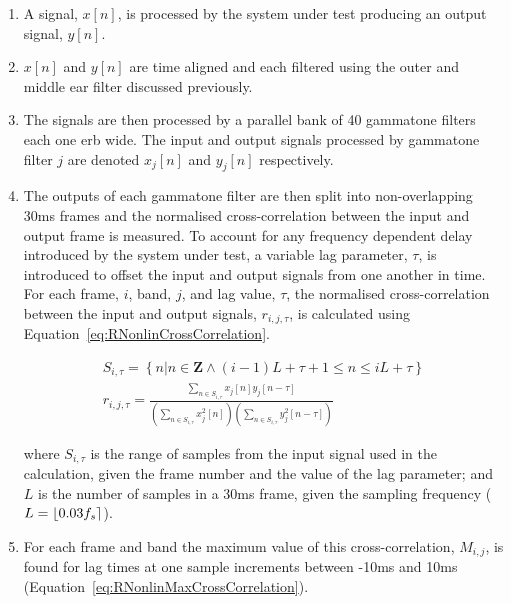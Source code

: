 			\begin{enumerate}
				\item A signal, $x[n]$, is processed by the system under test producing an output signal,
					$y[n]$.

				\item $x[n]$ and $y[n]$ are time aligned and each filtered using the outer and middle ear
					filter discussed previously.

				\item The signals are then processed by a parallel bank of 40 gammatone filters each one
					\acrshort{erb} wide. The input and output signals processed by gammatone filter $j$
					are denoted $x_j[n]$ and $y_j[n]$ respectively.

				\item The outputs of each gammatone filter are then split into non-overlapping 30ms frames
					and the normalised cross-correlation between the input and output frame is
					measured.  To account for any frequency dependent delay introduced by the system
					under test, a variable lag parameter, $\tau$, is introduced to offset the input and
					output signals from one another in time. For each frame, $i$, band, $j$, and lag
					value, $\tau$, the normalised cross-correlation between the input and output
					signals, $r_{i,j,\tau}$, is calculated using
					Equation~\ref{eq:RNonlinCrossCorrelation}.

					\begin{gather}
						S_{i,\tau} = \left\{ n | n \in \textbf{Z} 
							   \land (i-1)L+\tau+1 \leq n \leq iL + \tau \right\} \nonumber \\
						r_{i,j,\tau} = \frac{\sum_{n \in S_{i,\tau}} x_{j}[n]y_{j}[n-\tau]}
							{\left( \sum_{n \in S_{i,\tau}} x_{j}^{2}[n] \right) 
							\left( \sum_{n \in S_{i,\tau}} y_{j}^{2}[n-\tau] \right)}
						\label{eq:RNonlinCrossCorrelation}
					\end{gather}

					where $S_{i,\tau}$ is the range of samples from the input signal used in the
					calculation, given the frame number and the value of the lag parameter; and $L$ is
					the number of samples in a 30ms frame, given the sampling frequency ($L =
					\left\lfloor0.03f_{s}\right\rceil$). 

				\item For each frame and band the maximum value of this cross-correlation, $M_{i,j}$, is
					found for lag times at one sample increments between -10ms and 10ms
					(Equation~\ref{eq:RNonlinMaxCrossCorrelation}).


\end{enumerate}
